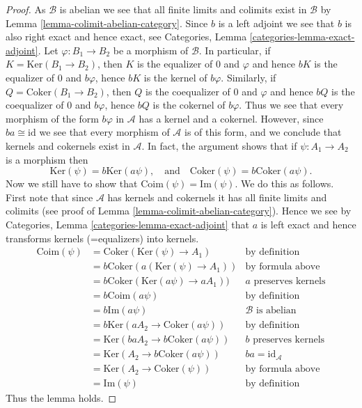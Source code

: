 \begin{proof}
As $\mathcal{B}$ is abelian we see that all finite limits and colimits
exist in $\mathcal{B}$ by Lemma \ref{lemma-colimit-abelian-category}.
Since $b$ is a left adjoint we see that $b$ is also right exact
and hence exact, see
Categories, Lemma \ref{categories-lemma-exact-adjoint}.
Let $\varphi : B_1 \to B_2$ be a morphism of $\mathcal{B}$.
In particular, if $K = \text{Ker}(B_1 \to B_2)$, then $K$ is
the equalizer of $0$ and $\varphi$ and hence
$bK$ is the equalizer of $0$ and $b\varphi$, hence
$bK$ is the kernel of $b\varphi$. Similarly, if
$Q = \text{Coker}(B_1 \to B_2)$, then $Q$ is
the coequalizer of $0$ and $\varphi$ and hence
$bQ$ is the coequalizer of $0$ and $b\varphi$, hence
$bQ$ is the cokernel of $b\varphi$. Thus we see that every morphism
of the form $b\varphi$ in $\mathcal{A}$ has a kernel and a cokernel.
However, since $ba \cong \text{id}$ we see that every morphism of
$\mathcal{A}$ is of this form, and we conclude that kernels and
cokernels exist in $\mathcal{A}$. In fact, the argument shows that
if $\psi : A_1 \to A_2$ is a morphism then
$$
\text{Ker}(\psi) = b\text{Ker}(a\psi),
\quad\text{and}\quad
\text{Coker}(\psi) = b\text{Coker}(a\psi).
$$
Now we still have to show that $\text{Coim}(\psi)= \text{Im}(\psi)$.
We do this as follows.
First note that since $\mathcal{A}$ has kernels and cokernels it
has all finite limits and colimits (see proof of
Lemma \ref{lemma-colimit-abelian-category}).
Hence we see by Categories, Lemma \ref{categories-lemma-exact-adjoint}
that $a$ is left exact and
hence transforms kernels (=equalizers) into kernels.
\begin{align*}
\text{Coim}(\psi)
& =
\text{Coker}(\text{Ker}(\psi) \to A_1)
& \text{by definition} \\
& =
b\text{Coker}(a(\text{Ker}(\psi) \to A_1))
& \text{by formula above} \\
& =
b\text{Coker}(\text{Ker}(a\psi) \to aA_1))
& a\text{ preserves kernels} \\
& =
b\text{Coim}(a\psi)
& \text{by definition} \\
& =
b\text{Im}(a\psi)
& \mathcal{B}\text{ is abelian} \\
& =
b\text{Ker}(aA_2 \to \text{Coker}(a\psi))
& \text{by definition} \\
& =
\text{Ker}(baA_2 \to b\text{Coker}(a\psi))
& b\text{ preserves kernels} \\
& =
\text{Ker}(A_2 \to b\text{Coker}(a\psi))
& ba = \text{id}_\mathcal{A} \\
& =
\text{Ker}(A_2 \to \text{Coker}(\psi))
& \text{by formula above} \\
& =
\text{Im}(\psi)
& \text{by definition}
\end{align*}
Thus the lemma holds.
\end{proof}




